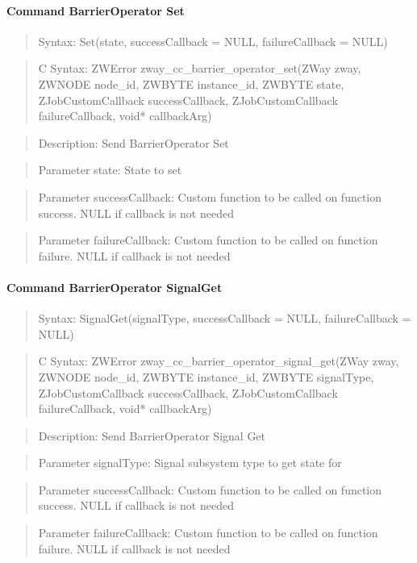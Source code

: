 \paragraph{Command BarrierOperator Set}
\begin{quote}Syntax: Set(state, successCallback = NULL, failureCallback = NULL)\end{quote}
\begin{quote}C Syntax: ZWError zway\_cc\_barrier\_operator\_set(ZWay zway, ZWNODE node\_id, ZWBYTE instance\_id, ZWBYTE state, ZJobCustomCallback successCallback, ZJobCustomCallback failureCallback, void* callbackArg)\end{quote}
\begin{quote}Description: Send BarrierOperator Set\end{quote}
\begin{quote}Parameter state: State to set\end{quote}
\begin{quote}Parameter successCallback: Custom function to be called on function success. NULL if callback is not needed\end{quote}
\begin{quote}Parameter failureCallback: Custom function to be called on function failure. NULL if callback is not needed\end{quote}


\paragraph{Command BarrierOperator SignalGet}
\begin{quote}Syntax: SignalGet(signalType, successCallback = NULL, failureCallback = NULL)\end{quote}
\begin{quote}C Syntax: ZWError zway\_cc\_barrier\_operator\_signal\_get(ZWay zway, ZWNODE node\_id, ZWBYTE instance\_id, ZWBYTE signalType, ZJobCustomCallback successCallback, ZJobCustomCallback failureCallback, void* callbackArg)\end{quote}
\begin{quote}Description: Send BarrierOperator Signal Get\end{quote}
\begin{quote}Parameter signalType: Signal subsystem type to get state for\end{quote}
\begin{quote}Parameter successCallback: Custom function to be called on function success. NULL if callback is not needed\end{quote}
\begin{quote}Parameter failureCallback: Custom function to be called on function failure. NULL if callback is not needed\end{quote}


